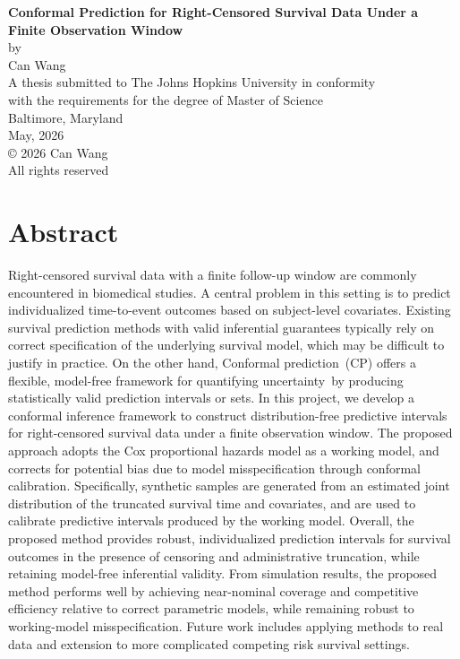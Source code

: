 \documentclass[12pt]{article}
\begin{document}
\setlength{\parskip}{3pt}
\baselineskip=24pt

\newif\ifblind
\newif\ifunblind
\unblindtrue

\thispagestyle{empty}
\baselineskip=18pt
\begin{center}

\vspace*{3\baselineskip}
{\bfseries Conformal Prediction for Right-Censored Survival Data Under a Finite Observation Window}\\[6\baselineskip]
by\\
Can Wang\\[3\baselineskip]
A thesis submitted to The Johns Hopkins University in conformity\\
with the requirements for the degree of Master of Science\\[4\baselineskip]
Baltimore, Maryland\\
May, 2026\\[6\baselineskip]
{\copyright{} 2026 Can Wang \\
All rights reserved}
\end{center}
\baselineskip=24pt

\newpage
\part*{Abstract}
Right-censored survival data with a finite follow-up window are commonly encountered in biomedical studies. A central problem in this setting is to predict individualized time-to-event outcomes based on subject-level covariates. Existing survival prediction methods with valid inferential guarantees typically rely on correct specification of the underlying survival model, which may be difficult to justify in practice. On the other hand, Conformal prediction (CP) offers a flexible, model-free framework for quantifying uncertainty by producing statistically valid prediction intervals or sets. In this project, we develop a conformal inference framework to construct distribution-free predictive intervals for right-censored survival data under a finite observation window. The proposed approach adopts the Cox proportional hazards model as a working model, and corrects for potential bias due to model misspecification through conformal calibration. Specifically, synthetic samples are generated from an estimated joint distribution of the truncated survival time and covariates, and are used to calibrate predictive intervals produced by the working model. Overall, the proposed method provides robust, individualized prediction intervals for survival outcomes in the presence of censoring and administrative truncation, while retaining model-free inferential validity. From simulation results, the proposed method performs well by achieving near-nominal coverage and competitive efficiency relative to correct parametric models, while remaining robust to working-model misspecification. Future work includes applying methods to real data and extension to more complicated competing risk survival settings.
\end{document}
